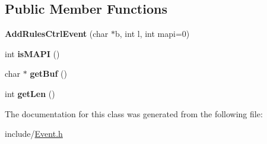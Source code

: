 \subsection*{Public Member Functions}
\begin{DoxyCompactItemize}
\item 
\mbox{\label{classAddRulesCtrlEvent_a5af5ac4b6ff5fda869dae033adc268e9}} 
{\bfseries Add\+Rules\+Ctrl\+Event} (char $\ast$b, int l, int mapi=0)
\item 
\mbox{\label{classAddRulesCtrlEvent_a9f79d6aa3898d5eb9c326b21fb4d3679}} 
int {\bfseries is\+M\+A\+PI} ()
\item 
\mbox{\label{classAddRulesCtrlEvent_a3b3b81319eed1706b8fb33249a5ec673}} 
char $\ast$ {\bfseries get\+Buf} ()
\item 
\mbox{\label{classAddRulesCtrlEvent_a5988f3ea086722297af44c09d7aa300d}} 
int {\bfseries get\+Len} ()
\end{DoxyCompactItemize}


The documentation for this class was generated from the following file\+:\begin{DoxyCompactItemize}
\item 
include/\hyperlink{Event_8h}{Event.\+h}\end{DoxyCompactItemize}
